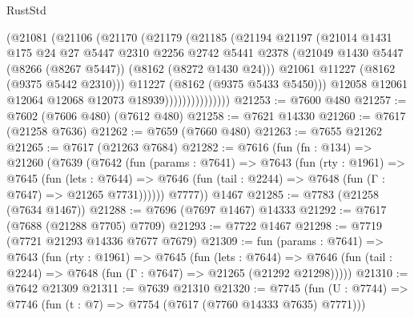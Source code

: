 \begin{lexlean}{RustStd}
\begin{coremodule}
                        (@21081
                          (@21106
                            (@21170
                              (@21179
                                (@21185
                                  (@21194
                                    @21197
                                    (@21014
                                      @1431
                                      @175
                                      @24
                                      @27
                                      @5447
                                      @2310
                                      @2256
                                      @2742
                                      @5441
                                      @2378
                                      (@21049
                                        @1430
                                        @5447
                                        (@8266 (@8267 @5447))
                                        (@8162 (@8272 @1430 @24)))
                                      @21061
                                      @11227
                                      (@8162 (@9375 @5442 @2310)))
                                    @11227
                                    (@8162 (@9375 @5433 @5450)))
                                  @12058
                                  @12061
                                  @12064
                                  @12068
                                  @12073
                                  @18939)))))))))))))))
@21253 := @7600 @480
@21257 := @7602 (@7606 @480) (@7612 @480)
@21258 := @7621 @14330
@21260 := @7617 (@21258 @7636)
@21262 := @7659 (@7660 @480)
@21263 := @7655 @21262
@21265 := @7617 (@21263 @7684)
@21282 := @7616
    (fun (fn : @134) =>
    @21260
      (@7639
        (@7642
          (fun (params : @7641) =>
          @7643
            (fun (rty : @1961) =>
            @7645
              (fun (lets : @7644) =>
              @7646 (fun (tail : @2244) => @7648 (fun (Γ : @7647) => @21265 @7731))))))
        @7777))
    @1467
@21285 := @7783 (@21258 (@7634 @1467))
@21288 := @7696 (@7697 @1467) @14333
@21292 := @7617 (@7688 (@21288 @7705) @7709)
@21293 := @7722 @1467
@21298 := @7719 (@7721 @21293 @14336 @7677 @7679)
@21309 := fun (params : @7641) =>
  @7643
    (fun (rty : @1961) =>
    @7645
      (fun (lets : @7644) =>
      @7646 (fun (tail : @2244) => @7648 (fun (Γ : @7647) => @21265 (@21292 @21298)))))
@21310 := @7642 @21309
@21311 := @7639 @21310
@21320 := @7745
    (fun (U : @7744) => @7746 (fun (t : @7) => @7754 (@7617 (@7760 @14333 @7635) @7771)))

\end{coremodule}
\end{lexlean}

